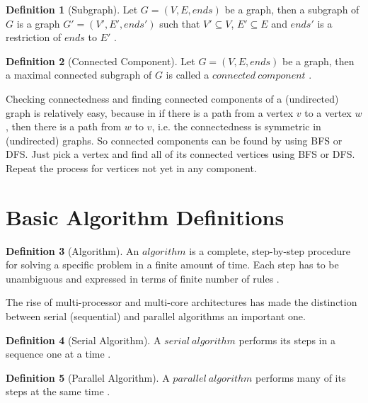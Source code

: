 \documentclass{report}
\theoremstyle{plain}
\theoremstyle{definition}
\newtheorem{definition}{Definition}
\theoremstyle{remark}
\numberwithin{definition}{chapter}
\numberwithin{example}{chapter}
\numberwithin{figure}{chapter}
\begin{document}
\begin{definition}[Subgraph]
Let $G = (V, E, ends)$ be a graph, then a subgraph of $G$ is a graph $G'=(V', E', ends')$ such that $V' \subseteq V$, $E' \subseteq E$ and $ends'$ is a restriction of $ends$ to $E'$ \cite{bondy2008graph}.
\end{definition}

\begin{definition}[Connected Component]
Let $G = (V, E, ends)$ be a graph, then a maximal connected subgraph of $G$ is called a $connected \ component$ \cite{bollobas1998modern}.
\end{definition}

Checking connectedness and finding connected components of a (undirected) graph is relatively easy, because in if there is a path from a vertex $v$ to a vertex $w$, then there is a path from $w$ to $v$, i.e. the connectedness is symmetric in (undirected) graphs. So connected components can be found by using BFS or DFS. Just pick a vertex and find all of its connected vertices using BFS or DFS. Repeat the process for vertices not yet in any component.

\section{Basic Algorithm Definitions}

\begin{definition}[Algorithm]
An $algorithm$ is a complete, step-by-step procedure for solving a specific problem in a finite amount of time. Each step has to be unambiguous and expressed in terms of finite number of rules \cite{berman1996fundamentals}.
\end{definition}

The rise of multi-processor and multi-core architectures has made the distinction between serial (sequential) and parallel algorithms an important one.

\begin{definition}[Serial Algorithm]
A $serial \ algorithm$ performs its steps in a sequence one at a time \cite{berman1996fundamentals}.
\end{definition}

\begin{definition}[Parallel Algorithm]
A $parallel \ algorithm$ performs many of its steps at the same time \cite{berman1996fundamentals}.
\end{definition}
\end{document}

